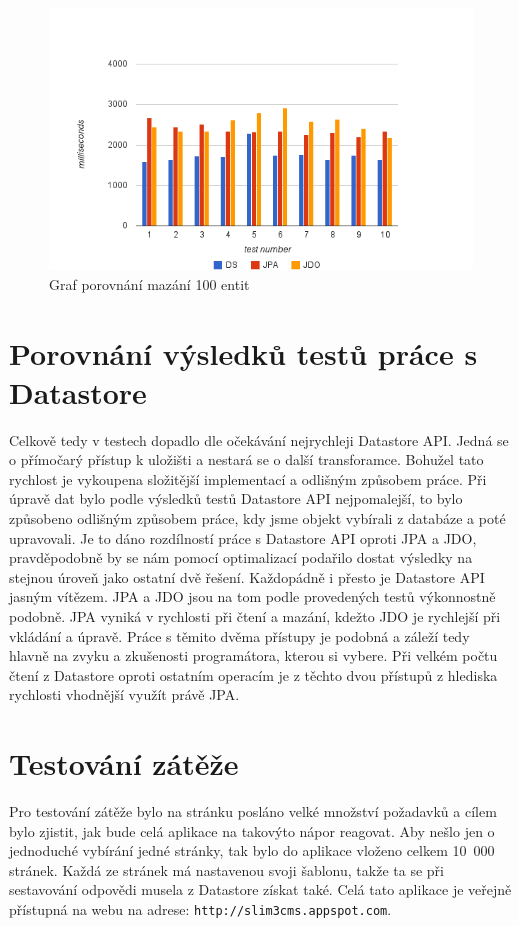 \begin{figure}[h]
\begin{center}
\includegraphics[width=6.5in]{figures/delete.png}
\caption{Graf porovnání mazání 100 entit}
\label{fig:delete}
\end{center}
\end{figure}

\section{Porovnání výsledků testů práce s Datastore}
Celkově tedy v testech dopadlo dle očekávání nejrychleji Datastore API. Jedná se o přímočarý přístup k uložišti a nestará se o další transforamce. Bohužel tato rychlost je vykoupena složitější implementací a odlišným způsobem práce. Při úpravě dat bylo podle výsledků testů Datastore API nejpomalejší, to bylo způsobeno odlišným způsobem práce, kdy jsme objekt vybírali z databáze a poté upravovali. Je to dáno rozdílností práce s Datastore API oproti JPA a JDO, pravděpodobně by se nám pomocí optimalizací podařilo dostat výsledky na stejnou úroveň jako ostatní dvě řešení. Každopádně i přesto je Datastore API jasným vítězem. JPA a JDO jsou na tom podle provedených testů výkonnostně podobně. JPA vyniká v rychlosti při čtení a mazání, kdežto JDO je rychlejší při vkládání a úpravě. Práce s těmito dvěma přístupy je podobná a záleží tedy hlavně na zvyku a zkušenosti programátora, kterou si vybere. Při velkém počtu čtení z Datastore oproti ostatním operacím je z těchto dvou přístupů z hlediska rychlosti vhodnější využít právě JPA.


\section{Testování zátěže}
Pro testování zátěže bylo na stránku posláno velké množství požadavků a cílem bylo zjistit, jak bude celá aplikace na takovýto nápor reagovat. Aby nešlo jen o jednoduché vybírání jedné stránky, tak bylo do aplikace vloženo celkem 10~000 stránek. Každá ze stránek má nastavenou svoji šablonu, takže ta se při sestavování odpovědi musela z Datastore získat také. Celá tato aplikace je veřejně přístupná na webu na adrese: \verb|http://slim3cms.appspot.com|.


